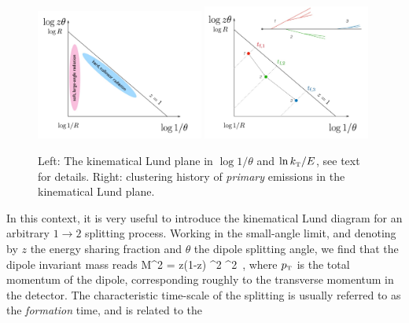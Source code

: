 \begin{figure}
\centering
\includegraphics[width=0.49\textwidth]{figures/kinematics/LundPlot_Regimes_test3}%
\includegraphics[width=0.49\textwidth]{figures/kinematics/LundPlot_SplittingHistory_test3}%
\caption{Left: The kinematical Lund plane in $\log 1/\theta$ and $\ln k_{\text{\tiny T}}/E$, see text for details. Right: clustering history of {\sl primary} emissions in the kinematical Lund plane.
}
\label{fig:PS0}
\end{figure}
In this context, it is very useful to introduce the kinematical Lund diagram \cite{Andersson:1988gp} for an arbitrary $1\to 2$ splitting process. 
Working in the small-angle limit, and denoting by $z$ the energy sharing fraction and $\theta$ the dipole splitting angle, we find that the dipole invariant mass reads
\beq
\label{eq:DipoleMass}
M^2 = z(1-z) \pT^2 \theta^2 \,,
\eeq
where $p_{\text{\tiny T}}$ is the total momentum of the dipole, corresponding roughly to the transverse momentum in the detector.
The characteristic time-scale of the splitting is usually referred to as the \textsl{formation} time, and is related to the 
